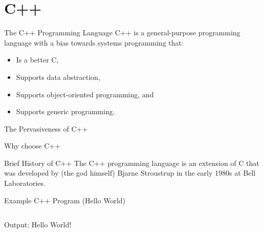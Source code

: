 \documentclass[../lecture1-introduction.tex]{subfiles}
\begin{document}
\section{C++}


\begin{frame}[fragile]{The C++ Programming Language}
    C++ is a general-purpose programming language with a bias towards systems
    programming that:
    \begin{itemize}
        \item Is a better C,
        \item Supports data abstraction,
        \item Supports object-oriented programming, and
        \item Supports generic programming.
    \end{itemize}
\end{frame}


\begin{frame}[fragile]{The Pervasiveness of C++}



\end{frame}


\begin{frame}[fragile]{Why choose C++}



\end{frame}


\begin{frame}[fragile]{Brief History of C++}
    The C++ programming language is an extension of C that was developed by
    (the god himself) Bjarne Stroustrup in the early 1980s at Bell Laboratories.
\end{frame}


\begin{frame}[fragile]{Example C++ Program (Hello World)}
    \inputminted[linenos=true]{c++}{code/helloworld.cpp}
    Output:
    Hello World!
\end{frame}

\end{document}
